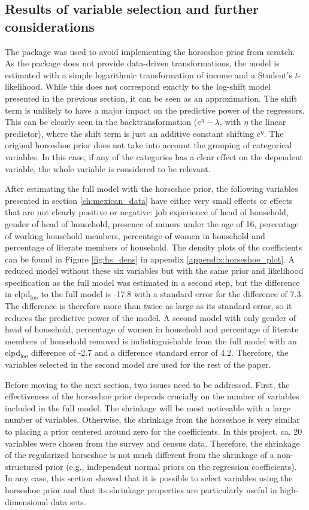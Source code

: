 \subsection{Results of variable selection and further considerations}
The package  was used to avoid implementing the horseshoe prior from scratch.
As the package does not provide data-driven transformations, the model is estimated with a simple logarithmic transformation of income and a Student's $t$-likelihood.
While this does not correspond exactly to the log-shift model presented in the previous section, it can be seen as an approximation.
The shift term is unlikely to have a major impact on the predictive power of the regressors.
This can be clearly seen in the backtransformation ($e^\eta - \lambda$, with $\eta$ the linear predictor), where the shift term is just an additive constant shifting $e^\eta$.
The original horseshoe prior does not take into account the grouping of categorical variables.
In this case, if any of the categories has a clear effect on the dependent variable, the whole variable is considered to be relevant.

After estimating the full model with the horseshoe prior, the following variables presented in section \ref{ch:mexican_data} have either very small effects or effects that are not clearly positive or negative: job experience of head of household, gender of head of household, presence of minors under the age of 16, percentage of working household members, percentage of women in household and percentage of literate members of household.
The density plots of the coefficients can be found in Figure \ref{fig:hs_dens} in appendix \ref{appendix:horseshoe_plot}.
A reduced model without these six variables but with the same prior and likelihood specification as the full model was estimated in a second step, but the difference in elpd$_{\text{loo}}$ to the full model is -17.8 with a standard error for the difference of 7.3.
The difference is therefore more than twice as large as its standard error, so it reduces the predictive power of the model.
A second model with only gender of head of household, percentage of women in household and percentage of literate members of household removed is indistinguishable from the full model with an elpd$_{\text{loo}}$ difference of -2.7 and a difference standard error of 4.2.
Therefore, the variables selected in the second model are used for the rest of the paper.

Before moving to the next section, two issues need to be addressed.
First, the effectiveness of the horseshoe prior depends crucially on the number of variables included in the full model.
The shrinkage will be most noticeable with a large number of variables.
Otherwise, the shrinkage from the horseshoe is very similar to placing a prior centered around zero for the coefficients.
In this project, ca. 20 variables were chosen from the survey and census data.
Therefore, the shrinkage of the regularized horseshoe is not much different from the shrinkage of a non-structured prior (e.g., independent normal priors on the regression coefficients).
In any case, this section showed that it is possible to select variables using the horseshoe prior and that its shrinkage properties are particularly useful in high-dimensional data sets.

